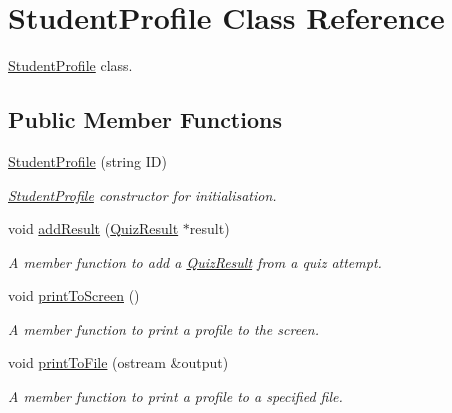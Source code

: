 \hypertarget{class_student_profile}{}\section{Student\+Profile Class Reference}
\label{class_student_profile}


\hyperlink{class_student_profile}{Student\+Profile} class.  


\subsection*{Public Member Functions}
\begin{DoxyCompactItemize}
\item 
\hyperlink{class_student_profile_adff542cb5595ba22e7d0f43475610ef3}{Student\+Profile} (string I\+D)
\begin{DoxyCompactList}\small\item\em \hyperlink{class_student_profile}{Student\+Profile} constructor for initialisation. \end{DoxyCompactList}\item 
void \hyperlink{class_student_profile_a4af9ea78b939db8bca286f753550e698}{add\+Result} (\hyperlink{class_quiz_result}{Quiz\+Result} $\ast$result)
\begin{DoxyCompactList}\small\item\em A member function to add a \hyperlink{class_quiz_result}{Quiz\+Result} from a quiz attempt. \end{DoxyCompactList}\item 
void \hyperlink{class_student_profile_af2d8e1bbc6f054544607ec7d264c88a4}{print\+To\+Screen} ()
\begin{DoxyCompactList}\small\item\em A member function to print a profile to the screen. \end{DoxyCompactList}\item 
void \hyperlink{class_student_profile_a53043210f40c1b2dea4a0c43eb9dcd58}{print\+To\+File} (ostream \&output)
\begin{DoxyCompactList}\small\item\em A member function to print a profile to a specified file. \end{DoxyCompactList}\end{DoxyCompactItemize}
